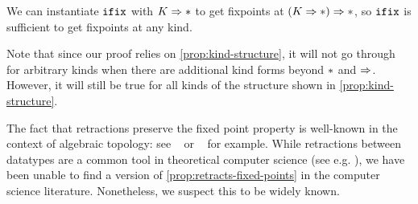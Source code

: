We can instantiate $\operatorname{\texttt{ifix}}$ with $K \Rightarrow \operatorname{\ast}$ to get fixpoints at $(K
\Rightarrow \operatorname{\ast}) \Rightarrow \operatorname{\ast}$, so $\operatorname{\texttt{ifix}}$ is sufficient to get fixpoints
at any kind.

Note that since our proof relies on \cref{prop:kind-structure}, it will not go
through for arbitrary kinds when there are additional kind forms beyond $\operatorname{\ast}$
and $\Rightarrow$. However, it will still be true for all kinds of the structure
shown in \cref{prop:kind-structure}.

The fact that retractions preserve the fixed point property is
well-known in the context of algebraic topology: see
~\cite[Exercise 4.7]{fulton1995algebraic} or
~\cite[Proposition 23.9]{bredon1993topology} for example. While retractions
between datatypes are a common tool in theoretical computer science
(see e.g. \cite{stirling}), we have been unable to find a version of
\cref{prop:retracts-fixed-points} in the computer science
literature. Nonetheless, we suspect this to be widely known.
